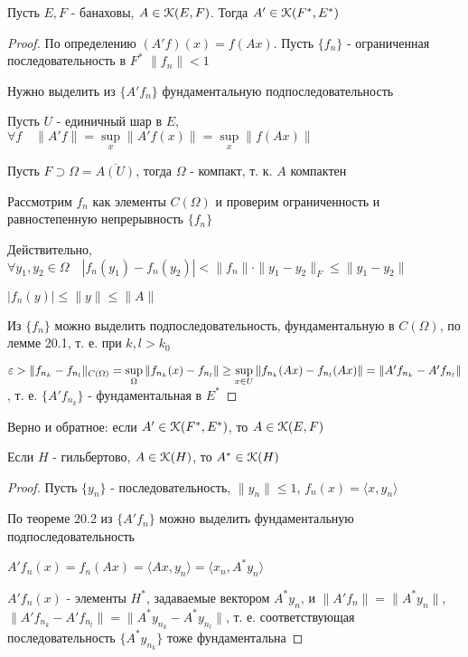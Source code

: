 \documentclass[a4paper,12pt]{report}
\newcommand*{\hm}[1]{#1\nobreak\discretionary{}%
            {\hbox{$\mathsurround=0pt #1$}}{}}
\begin{document}
\begin{thm}
Пусть $E,F$ - банаховы, $A\in\EuScript K(E,F)$. Тогда $A'\in\EuScript K(F^*,E^*)$
\end{thm}
\begin{proof}
По определению $(A'f)(x)=f(Ax)$. Пусть $\{f_n\}$ - ограниченная последовательность в $F^*$ $\|f_n\|<1$

Нужно выделить из $\{A'f_n\}$ фундаментальную подпоследовательность

Пусть $U$ - единичный шар в $E$, $\forall f\quad\|A'f\|=\sup\limits_x\|A'f(x)\|=\sup\limits_x\|f(Ax)\|$

Пусть $F\supset\Omega=\overline{A(U)}$, тогда $\Omega$ - компакт, т. к. $A$ компактен

Рассмотрим $f_n$ как элементы $C(\Omega)$ и проверим ограниченность и равностепенную непрерывность $\{f_n\}$

Действительно, $\forall y_1,y_2\in\Omega\quad|f_n(y_1)-f_n(y_2)|<\|f_n\|\cdot\|y_1-y_2\|_F\le\|y_1-y_2\|$

$|f_n(y)|\le\|y\|\le\|A\|$

Из $\{f_n\}$ можно выделить подпоследовательность, фундаментальную в $C(\Omega)$, по лемме 20.1, т. е. при $k,l>k_0$

$\varepsilon>\|f_{n_k}-f_{n_l}\|_{C(\Omega)}=\sup\limits_\Omega\|f_{n_k}(x)-f_{n_l}\|\ge\sup\limits_{x\in U}\|f_{n_k}(Ax)-f_{n_l}(Ax)\|\hm=\|A' f_{n_k}-A'f_{n_l}\|$, т. е. $\{A'f_{n_k}\}$ - фундаментальная в $E^*$
\end{proof}
 


\begin{rem}
Верно и обратное: если $A'\in\EuScript K(F^*,E^*)$, то $A\in\EuScript K(E,F)$
\end{rem}
 


\begin{cons}
Если $H$ - гильбертово, $A\in\EuScript K(H)$, то $A^*\in\EuScript K(H)$
\end{cons}
\begin{proof}
Пусть $\{y_n\}$ - последовательность, $\|y_n\|\le1$, $f_n(x)=\langle x,y_n\rangle$

По теореме 20.2 из $\{A'f_n\}$ можно выделить фундаментальную подпоследовательность

$A'f_n(x)=f_n(Ax)=\langle Ax,y_n\rangle=\langle x_n,A^* y_n\rangle$

$A'f_n(x)$ - элементы $H^*$, задаваемые вектором $A^*y_n$, и $\|A'f_n\|=\|A^*y_n\|$, $\|A'f_{n_k}-A'f_{n_l}\|=\|A^*y_{n_k}-A^*y_{n_l}\|$, т. е. соответствующая последовательность $\{A^*y_{n_k}\}$ тоже фундаментальна
\end{proof}
 
\end{document}
